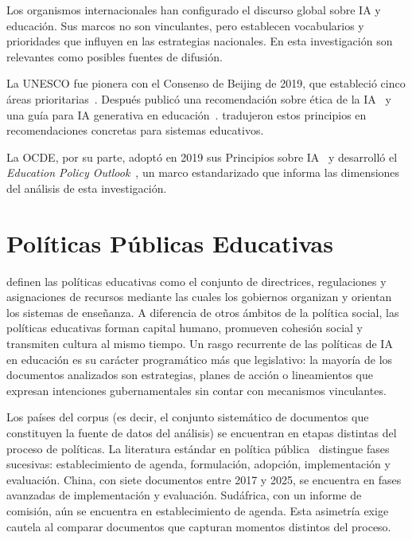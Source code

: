 Los organismos internacionales han configurado el discurso global sobre IA y educación. Sus marcos no son vinculantes, pero establecen vocabularios y prioridades que influyen en las estrategias nacionales. En esta investigación son relevantes como posibles fuentes de difusión.

La UNESCO fue pionera con el Consenso de Beijing de 2019, que estableció cinco áreas prioritarias~\citep{unesco2019beijing}. Después publicó una recomendación sobre ética de la IA~\citep{unesco2021ai} y una guía para IA generativa en educación~\citep{unesco2023genai}. \citet{miao2021guidance} tradujeron estos principios en recomendaciones concretas para sistemas educativos.

La OCDE, por su parte, adoptó en 2019 sus Principios sobre IA~\citep{oecd2019ai} y desarrolló el \textit{Education Policy Outlook}~\citep{oecd2021epo}, un marco estandarizado que informa las dimensiones del análisis de esta investigación.


\section{Políticas Públicas Educativas}

\citet{rizvi2010globalizing} definen las políticas educativas como el conjunto de directrices, regulaciones y asignaciones de recursos mediante las cuales los gobiernos organizan y orientan los sistemas de enseñanza. A diferencia de otros ámbitos de la política social, las políticas educativas forman capital humano, promueven cohesión social y transmiten cultura al mismo tiempo. Un rasgo recurrente de las políticas de IA en educación es su carácter programático más que legislativo: la mayoría de los documentos analizados son estrategias, planes de acción o lineamientos que expresan intenciones gubernamentales sin contar con mecanismos vinculantes.

Los países del corpus (es decir, el conjunto sistemático de documentos que constituyen la fuente de datos del análisis) se encuentran en etapas distintas del proceso de políticas. La literatura estándar en política pública~\citep{howlett2003studying} distingue fases sucesivas: establecimiento de agenda, formulación, adopción, implementación y evaluación. China, con siete documentos entre 2017 y 2025, se encuentra en fases avanzadas de implementación y evaluación. Sudáfrica, con un informe de comisión, aún se encuentra en establecimiento de agenda. Esta asimetría exige cautela al comparar documentos que capturan momentos distintos del proceso.


